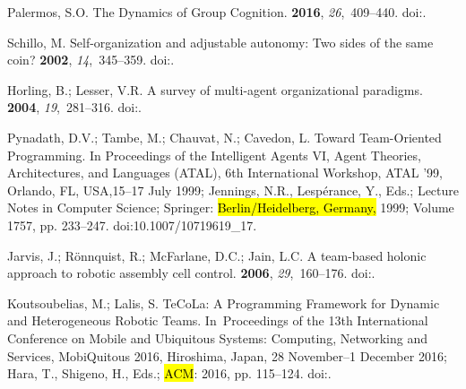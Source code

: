 \documentclass[jsan,article,accept,moreauthors,pdftex]{Definitions/mdpi}
\begin{document}
\begin{thebibliography}{999}
Palermos, S.O.
\newblock The Dynamics of Group Cognition.
 {\bf 2016}, {\em 26},~409--440.
\newblock
  doi:{\href{https://doi.org/10.1007/s11023-016-9402-5}{}}.

Schillo, M.
\newblock Self-organization and adjustable autonomy: Two sides of the same
  coin?
 {\bf 2002}, {\em 14},~345--359.
\newblock
  doi:{\href{https://doi.org/10.1080/0954009021000068718}{}}.

Horling, B.; Lesser, V.R.
\newblock A survey of multi-agent organizational paradigms.
 {\bf 2004}, {\em 19},~281--316.
\newblock
  doi:{\href{https://doi.org/10.1017/S0269888905000317}{}}.

Pynadath, D.V.; Tambe, M.; Chauvat, N.; Cavedon, L.
\newblock Toward Team-Oriented Programming.
\newblock   In Proceedings of the Intelligent Agents VI, Agent Theories, Architectures, and Languages
  (ATAL), 6th International Workshop, {ATAL} '99, Orlando, FL, USA,15--17 July
1999; Jennings, N.R., Lesp{\'{e}}rance, Y., Eds.;  Lecture Notes in Computer Science; 
  Springer:  \hl{Berlin/Heidelberg, Germany,} %
  1999; Volume 1757,  pp.
  233--247.
\newblock
  doi:10.1007/10719619\_17.

Jarvis, J.; R{\"{o}}nnquist, R.; McFarlane, D.C.; Jain, L.C.
\newblock A team-based holonic approach to robotic assembly cell control.
 {\bf 2006}, {\em 29},~160--176.
\newblock
  doi:{\href{https://doi.org/10.1016/j.jnca.2004.10.001}{}}.

Koutsoubelias, M.; Lalis, S.
\newblock TeCoLa: {A} Programming Framework for Dynamic and Heterogeneous
  Robotic Teams.
\newblock  In~Proceedings of the 13th International Conference on Mobile and
  Ubiquitous Systems: Computing, Networking and Services, MobiQuitous 2016,
  Hiroshima, Japan, 28 November--1 December 2016; Hara, T., Shigeno, H., Eds.;
  \hl{ACM}: 2016, pp. 115--124.
\newblock
  doi:{\href{https://doi.org/10.1145/2994374.2994397}{}}.


\end{thebibliography}
\end{document}
